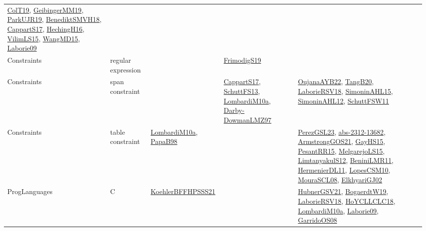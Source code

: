 {\begin{longtable}{lp{3cm}>{\raggedright}p{6cm}>{\raggedright}p{6cm}p{8cm}}
\href{papers/ColT19.pdf}{ColT19}\cite{ColT19}, \href{papers/GeibingerMM19.pdf}{GeibingerMM19}\cite{GeibingerMM19}, \href{papers/ParkUJR19.pdf}{ParkUJR19}\cite{ParkUJR19}, \href{papers/BenediktSMVH18.pdf}{BenediktSMVH18}\cite{BenediktSMVH18}, \href{papers/CappartS17.pdf}{CappartS17}\cite{CappartS17}, \href{papers/HechingH16.pdf}{HechingH16}\cite{HechingH16}, \href{papers/VilimLS15.pdf}{VilimLS15}\cite{VilimLS15}, \href{articles/WangMD15.pdf}{WangMD15}\cite{WangMD15}, \href{papers/Laborie09.pdf}{Laborie09}\cite{Laborie09}\\
Constraints & regular expression &  & \href{papers/FrimodigS19.pdf}{FrimodigS19}\cite{FrimodigS19} & \\
Constraints & span constraint &  & \href{papers/CappartS17.pdf}{CappartS17}\cite{CappartS17}, \href{papers/SchuttFS13.pdf}{SchuttFS13}\cite{SchuttFS13}, \href{articles/LombardiM10a.pdf}{LombardiM10a}\cite{LombardiM10a}, \href{articles/Darby-DowmanLMZ97.pdf}{Darby-DowmanLMZ97}\cite{Darby-DowmanLMZ97} & \href{papers/OujanaAYB22.pdf}{OujanaAYB22}\cite{OujanaAYB22}, \href{papers/TangB20.pdf}{TangB20}\cite{TangB20}, \href{articles/LaborieRSV18.pdf}{LaborieRSV18}\cite{LaborieRSV18}, \href{articles/SimoninAHL15.pdf}{SimoninAHL15}\cite{SimoninAHL15}, \href{papers/SimoninAHL12.pdf}{SimoninAHL12}\cite{SimoninAHL12}, \href{articles/SchuttFSW11.pdf}{SchuttFSW11}\cite{SchuttFSW11}\\
Constraints & table constraint & \href{articles/LombardiM10a.pdf}{LombardiM10a}\cite{LombardiM10a}, \href{articles/PapaB98.pdf}{PapaB98}\cite{PapaB98} &  & \href{papers/PerezGSL23.pdf}{PerezGSL23}\cite{PerezGSL23}, \href{articles/abs-2312-13682.pdf}{abs-2312-13682}\cite{abs-2312-13682}, \href{papers/ArmstrongGOS21.pdf}{ArmstrongGOS21}\cite{ArmstrongGOS21}, \href{papers/GayHS15.pdf}{GayHS15}\cite{GayHS15}, \href{papers/PesantRR15.pdf}{PesantRR15}\cite{PesantRR15}, \href{papers/MelgarejoLS15.pdf}{MelgarejoLS15}\cite{MelgarejoLS15}, \href{articles/LimtanyakulS12.pdf}{LimtanyakulS12}\cite{LimtanyakulS12}, \href{articles/BeniniLMR11.pdf}{BeniniLMR11}\cite{BeniniLMR11}, \href{papers/HermenierDL11.pdf}{HermenierDL11}\cite{HermenierDL11}, \href{articles/LopesCSM10.pdf}{LopesCSM10}\cite{LopesCSM10}, \href{papers/MouraSCL08.pdf}{MouraSCL08}\cite{MouraSCL08}, \href{papers/ElkhyariGJ02.pdf}{ElkhyariGJ02}\cite{ElkhyariGJ02}\\
ProgLanguages & C  & \href{articles/KoehlerBFFHPSSS21.pdf}{KoehlerBFFHPSSS21}\cite{KoehlerBFFHPSSS21} &  & \href{articles/HubnerGSV21.pdf}{HubnerGSV21}\cite{HubnerGSV21}, \href{papers/BogaerdtW19.pdf}{BogaerdtW19}\cite{BogaerdtW19}, \href{articles/LaborieRSV18.pdf}{LaborieRSV18}\cite{LaborieRSV18}, \href{papers/HoYCLLCLC18.pdf}{HoYCLLCLC18}\cite{HoYCLLCLC18}, \href{articles/LombardiM10a.pdf}{LombardiM10a}\cite{LombardiM10a}, \href{papers/Laborie09.pdf}{Laborie09}\cite{Laborie09}, \href{articles/GarridoOS08.pdf}{GarridoOS08}\cite{GarridoOS08}\\

\end{longtable}}
